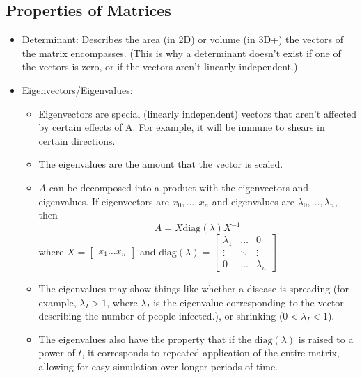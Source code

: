 \documentclass[10pt]{article}
\begin{document}
\subsection*{Properties of Matrices}
\begin{itemize}
	\item Determinant: Describes the area (in 2D) or volume (in 3D+) the vectors of the matrix encompasses.  (This is why a determinant doesn't exist if one of the vectors is zero, or if the vectors aren't linearly independent.)
	\item Eigenvectors/Eigenvalues: 
	\begin{itemize}
	    \item Eigenvectors are special (linearly independent) vectors that aren't affected by certain effects of A.  For example, it will be immune to shears in certain directions.
	    \item The eigenvalues are the amount that the vector is scaled.
	    \item $A$ can be decomposed into a product with the eigenvectors and eigenvalues.  If eigenvectors are $x_0, \dots, x_n$ and eigenvalues are $\lambda_0, \dots, \lambda_n$, then
	    \[A = X \text{diag}(\lambda)X^{-1}\]
        where $X = \begin{bmatrix} x_1 \dots x_n \end{bmatrix}$ and $\text{diag}(\lambda) = \begin{bmatrix} \lambda_1 & \dots & 0 \\ \vdots & \ddots & \vdots \\ 0 & \dots & \lambda_n \end{bmatrix}$.
        \item The eigenvalues may show things like whether a disease is spreading (for example, $\lambda_I > 1$, where $\lambda_I$ is the eigenvalue corresponding to the vector describing the number of people infected.), or shrinking ($0 < \lambda_I < 1$).
        \item The eigenvalues also have the property that if the $\text{diag}(\lambda)$ is raised to a power of $t$, it corresponds to repeated application of the entire matrix, allowing for easy simulation over longer periods of time.
    \end{itemize}
\end{itemize}
\end{document}
